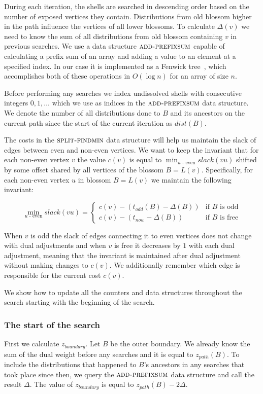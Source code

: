During each iteration, the shells are searched in descending order based on the number of exposed vertices they contain. Distributions from old blossom higher in the path influence the vertices of all lower blossoms. To calculate $\Delta(v)$ we need to know the sum of all distributions from old blossom containing $v$ in previous searches. We use a data structure $\textsc{add-prefixsum}$ capable of calculating a prefix sum of an array and adding a value to an element at a specified index. In our case it is implemented as a Fenwick tree~\cite{Fenwick1994AND}, which accomplishes both of these operations in $O(\log n)$ for an array of size $n$. 

Before performing any searches we index undissolved shells with consecutive integers $0, 1, \dots$ which we use as indices in the $\textsc{add-prefixsum}$ data structure. We denote the number of all distributions done to $B$ and its ancestors on the current path since the start of the current iteration as $dist(B)$.

The costs in the $\textsc{split-findmin}$ data structure will help us maintain the slack of edges between even and non-even vertices. We want to keep the invariant that for each non-even vertex $v$ the value $c(v)$ is equal to $\min_{u\text{ - even}} slack(vu)$ shifted by some offset shared by all vertices of the blossom $B = L(v)$. Specifically, for each non-even vertex $u$ in blossom $B = L(v)$ we maintain the following invariant:

\[ 
\min_{u \text{ - even}} slack(vu) = \begin{cases}
    c(v) - (t_{odd}(B) - \Delta(B)) & \text{if $B$ is odd} \\
    c(v) - (t_{now} - \Delta(B)) & \text{if $B$ is free}
\end{cases}
\]

When $v$ is odd the slack of edges connecting it to even vertices does not change with dual adjustments and when $v$ is free it decreases by $1$ with each dual adjustment, meaning that the invariant is maintained after dual adjustment without making changes to $c(v)$. We additionally remember which edge is responsible for the current cost $c(v)$.

We show how to update all the counters and data structures throughout the search starting with the beginning of the search. 

\subsubsection*{The start of the search}
First we calculate $z_{boundary}$. Let $B$ be the outer boundary. We already know the sum of the dual weight before any searches and it is equal to $z_{path}(B)$. To include the distributions that happened to $B$'s ancestors in any searches that took place since then, we query the $\textsc{add-prefixsum}$ data structure and call the result $\Delta$. The value of $z_{boundary}$ is equal to $z_{path}(B) - 2\Delta$. 

